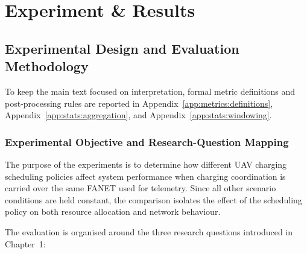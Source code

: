 \chapter{Experiment \& Results}
\label{chap:3}
%

\section{Experimental Design and Evaluation Methodology}
\label{sec:results:methodology}
To keep the main text focused on interpretation, formal metric definitions and
post-processing rules are reported in Appendix~\ref{app:metrics:definitions},
Appendix~\ref{app:stats:aggregation}, and Appendix~\ref{app:stats:windowing}.
\subsection{Experimental Objective and Research-Question Mapping}
\label{sec:results:rq-mapping}

The purpose of the experiments is to determine how different UAV charging
scheduling policies affect system performance when charging coordination is carried
over the same FANET used for telemetry. Since all other scenario conditions are
held constant, the comparison isolates the effect of the scheduling policy on both
resource allocation and network behaviour.

The evaluation is organised around the three research questions introduced in
Chapter~1:

